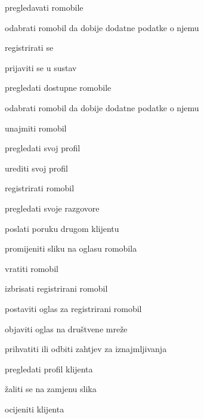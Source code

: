 			
			\begin{packed_enum}
				\item  {}
				
				\begin{packed_enum}
					
					\item pregledavati romobile
					\item odabrati romobil da dobije dodatne podatke o njemu
					\item registrirati se
					
					
				\end{packed_enum}
			
				\item  {}
				
				\begin{packed_enum}
					
					\item prijaviti se u sustav
					\item pregledati dostupne romobile
					\item odabrati romobil da dobije dodatne podatke o njemu
					\item unajmiti romobil
					\item pregledati svoj profil
					\item urediti svoj profil
					\item registrirati romobil
					\item pregledati svoje razgovore
					\item poslati poruku drugom klijentu
					\item promijeniti sliku na oglasu romobila
					\item vratiti romobil
					
				\end{packed_enum}
				\item  {}
				
				\begin{packed_enum}
				
				\item izbrisati registrirani romobil
				\item postaviti oglas za registrirani romobil
				\item objaviti oglas na društvene mreže
				\item prihvatiti ili odbiti zahtjev za iznajmljivanja
				\item pregledati profil klijenta
				\item žaliti se na zamjenu slika
				\item ocijeniti klijenta
				

\end{packed_enum}
\end{packed_enum}

